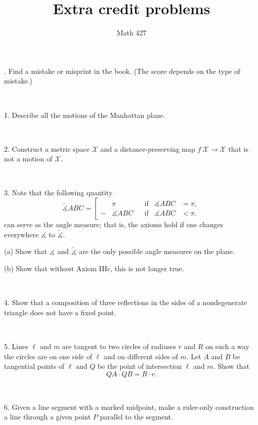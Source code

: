\documentclass[oneside,a4paper]{article}
\begin{document}
\title{Extra credit problems}
\author{Math 427}
\date{}
\maketitle


. Find a mistake or misprint in the book.
(The score depends on the type of mistake.)

\ 

\noi %
{1.} Describe all the motions of the Manhattan plane.

\ 

\noi %
{2.} %
Construct a metric space $\mathcal X$ and a distance-preserving map $f\:\mathcal X\to \mathcal X$ that is not a motion of $\mathcal X$.

\ 

\noi %
{3.} Note that the following quantity 
$$\tilde
\measuredangle ABC=\left[
\begin{aligned}
&\pi&&\text{if}&\measuredangle ABC&=\pi,
\\
-&\measuredangle ABC&&\text{if}&\measuredangle ABC&<\pi.
\end{aligned}
\right.$$
can serve as the angle measure; 
that is, the axioms hold if one changes everywhere $\measuredangle$ to $\tilde\measuredangle$.

\noi (a) Show that $\measuredangle$ and $\tilde\measuredangle$ are the only possible angle measures on the plane. 

\noi (b) Show that without Axiom IIIc, this is not longer true.

\ 

\noi %
{4.} %
Show that a composition of three reflections in the sides of a nondegenerate triangle does not have a fixed point.

\ 

\noi %
{5.} %
Lines $\ell$ and $m$ are tangent to two circles of radiuses $r$ and $R$ on such
a way the circles are on one side of $\ell$ and on different sides of $m$. 
Let $A$ and $B$ be
tangential points of $\ell$ and $Q$ be the point of intersection $\ell$ and $m$. 
Show that
$$QA\cdot QB = R\cdot r.$$

\ 

\noi %
{6.} %
Given a line segment with a marked midpoint, make a ruler-only construction a line through a given point $P$ parallel to the segment.
\end{document}
